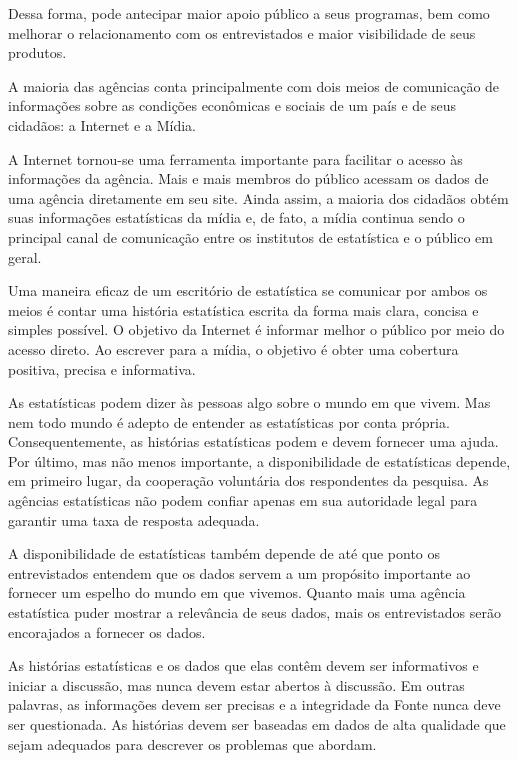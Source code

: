 Dessa forma, pode antecipar maior apoio público a seus programas, bem como melhorar o relacionamento com os entrevistados e maior visibilidade de seus produtos.\vskip0.3cm 

A maioria das agências conta principalmente com dois meios de comunicação de informações sobre as condições econômicas e sociais de um país e de seus cidadãos: a Internet e a Mídia.\vskip0.3cm 

A Internet tornou-se uma ferramenta importante para facilitar o acesso às informações da agência. Mais e mais membros do público acessam os dados de uma agência diretamente em seu site. Ainda assim, a maioria dos cidadãos obtém suas informações estatísticas da mídia e, de fato, a mídia continua sendo o principal canal de comunicação entre os institutos de estatística e o público em geral.\vskip0.3cm 


Uma maneira eficaz de um escritório de estatística se comunicar por ambos os meios é contar uma história estatística escrita da forma mais clara, concisa e simples possível. O objetivo da Internet é informar melhor o público por meio do acesso direto. Ao escrever para a mídia, o objetivo é obter uma cobertura positiva, precisa e informativa.\vskip0.3cm 

As estatísticas podem dizer às pessoas algo sobre o mundo em que vivem. Mas nem todo mundo é adepto de entender as estatísticas por conta própria. Consequentemente, as histórias estatísticas podem e devem fornecer uma ajuda.
Por último, mas não menos importante, a disponibilidade de estatísticas depende, em primeiro lugar, da cooperação voluntária dos respondentes da pesquisa. As agências estatísticas não podem confiar apenas em sua autoridade legal para garantir uma taxa de resposta adequada.\vskip0.3cm 


A disponibilidade de estatísticas também depende de até que ponto os entrevistados entendem que os dados servem a um propósito importante ao fornecer um espelho do mundo em que vivemos. Quanto mais uma agência estatística puder mostrar a relevância de seus dados, mais os entrevistados serão encorajados a fornecer os dados.\vskip0.3cm 

 As histórias estatísticas e os dados que elas contêm devem ser informativos e iniciar a discussão, mas nunca devem estar abertos à discussão. Em outras palavras, as informações devem ser precisas e a integridade da Fonte nunca deve ser questionada. As histórias devem ser baseadas em dados de alta qualidade que sejam adequados para descrever os problemas que abordam.\vskip0.3cm 

